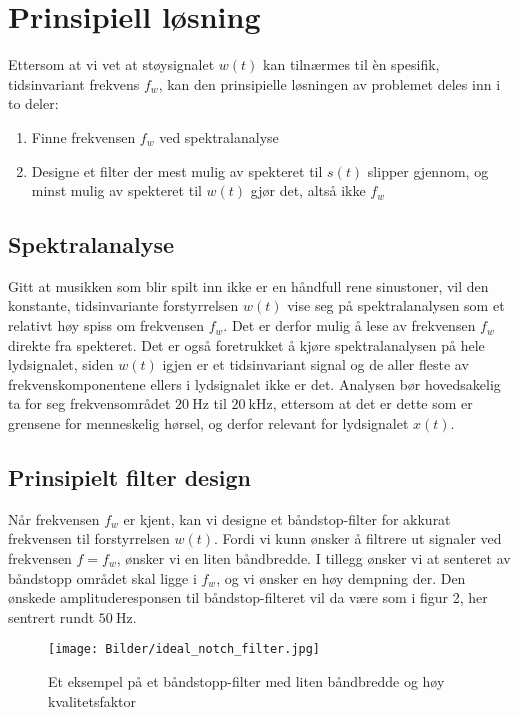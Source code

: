 \section{Prinsipiell løsning}
\label{prinsipiellLoesning}

Ettersom at vi vet at støysignalet $w(t)$ kan tilnærmes til èn spesifik, tidsinvariant frekvens $f_w$, kan den prinsipielle løsningen av 
problemet deles inn i to deler:
\begin{enumerate}
    \item Finne frekvensen $f_w$ ved spektralanalyse
    \item Designe et filter der mest mulig av spekteret til $s(t)$ slipper gjennom, og minst mulig av spekteret til $w(t)$ gjør det, altså ikke $f_w$
\end{enumerate}

\subsection{Spektralanalyse}
Gitt at musikken som blir spilt inn ikke er en håndfull rene sinustoner, vil den konstante, tidsinvariante forstyrrelsen $w(t)$ vise seg på 
spektralanalysen som et relativt høy spiss om frekvensen $f_w$. Det er derfor mulig å lese av frekvensen $f_w$ direkte fra spekteret. Det er også 
foretrukket å kjøre spektralanalysen på hele lydsignalet, siden $w(t)$ igjen er et tidsinvariant signal og de aller fleste av frekvenskomponentene ellers 
i lydsignalet ikke er det. Analysen bør hovedsakelig ta for seg frekvensområdet $\SI{20}{\hertz}$ til $\SI{20}{\kilo\hertz}$, ettersom 
at det er dette som er grensene for menneskelig hørsel, og derfor relevant for lydsignalet $x(t)$.

\subsection{Prinsipielt filter design}
Når frekvensen $f_w$ er kjent, kan vi designe et båndstop-filter for akkurat frekvensen til forstyrrelsen $w(t)$. 
Fordi vi kunn ønsker å filtrere ut signaler ved frekvensen $f = f_w$, ønsker vi en liten båndbredde. 
I tillegg ønsker vi at senteret av båndstopp området skal ligge i $f_w$, og vi ønsker  en høy dempning der.
Den ønskede amplituderesponsen til båndstop-filteret vil da være som i figur 2, her sentrert rundt $\SI{50}{\hertz}$.

\begin{figure}[H]
    \centering
    \texttt{[image: Bilder/ideal\_notch\_filter.jpg]}
    \caption{Et eksempel på et båndstopp-filter med liten båndbredde og høy kvalitetsfaktor}
\end{figure}

